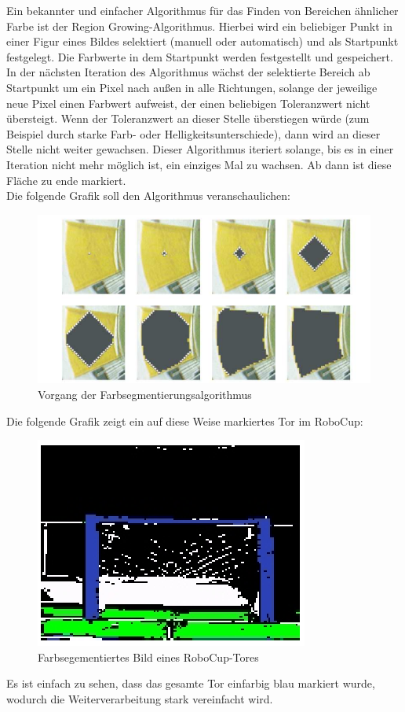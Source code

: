 \documentclass[a4paper,12pt]{article}
\begin{document}
\newpage
Ein bekannter und einfacher Algorithmus für das Finden von Bereichen ähnlicher
Farbe ist der Region Growing-Algorithmus. Hierbei wird ein beliebiger Punkt in
einer Figur eines Bildes selektiert (manuell oder automatisch) und als Startpunkt
festgelegt. Die Farbwerte in dem Startpunkt werden festgestellt und gespeichert.
In der nächsten Iteration des Algorithmus wächst der selektierte Bereich ab 
Startpunkt um ein Pixel nach außen in alle Richtungen, solange der jeweilige 
neue Pixel einen Farbwert aufweist, der einen beliebigen Toleranzwert nicht 
übersteigt. Wenn der Toleranzwert an dieser Stelle überstiegen würde (zum Beispiel durch
starke Farb- oder Helligkeitsunterschiede), dann wird an dieser Stelle nicht
weiter gewachsen. Dieser Algorithmus iteriert solange, bis es in einer Iteration
nicht mehr möglich ist, ein einziges Mal zu wachsen. Ab dann ist diese Fläche
zu ende markiert.
\\
Die folgende Grafik soll den Algorithmus veranschaulichen:
\begin{figure}[H]
    \includegraphics[scale=0.9]{region-growing.png}
    \caption{Vorgang der Farbsegmentierungsalgorithmus}
    \label{fig:color-seg-algo}
\end{figure}

\newpage
Die folgende Grafik zeigt ein auf diese Weise markiertes Tor im RoboCup:
\begin{figure}[H]
    \includegraphics{segmented-view2.png}
    \caption{Farbsegementiertes Bild eines RoboCup-Tores}
    \label{fig:color-seg}
\end{figure}
Es ist einfach zu sehen, dass das gesamte Tor einfarbig blau markiert wurde,
wodurch die Weiterverarbeitung stark vereinfacht wird.
\end{document}

